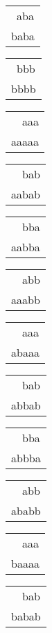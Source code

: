 \begin{tabular}{|l|} \hline
\ aba \\
baba \\
\hline
\end{tabular} 
\begin{tabular}{|l|} \hline
\ bbb \\
bbbb \\
\hline
\end{tabular} 
\begin{tabular}{|l|} \hline
\ \ aaa \\
aaaaa \\
\hline
\end{tabular} 
\begin{tabular}{|l|} \hline
\ \ bab \\
aabab \\
\hline
\end{tabular} 
\begin{tabular}{|l|} \hline
\ \ bba \\
aabba \\
\hline
\end{tabular} 
\begin{tabular}{|l|} \hline
\ \ abb \\
aaabb \\
\hline
\end{tabular} 
\begin{tabular}{|l|} \hline
\ \ aaa \\
abaaa \\
\hline
\end{tabular} 
\begin{tabular}{|l|} \hline
\ \ bab \\
abbab \\
\hline
\end{tabular} 
\begin{tabular}{|l|} \hline
\ \ bba \\
abbba \\
\hline
\end{tabular} 
\begin{tabular}{|l|} \hline
\ \ abb \\
ababb \\
\hline
\end{tabular} 
\begin{tabular}{|l|} \hline
\ \ aaa \\
baaaa \\
\hline
\end{tabular} 
\begin{tabular}{|l|} \hline
\ \ bab \\
babab \\
\hline
\end{tabular} 
